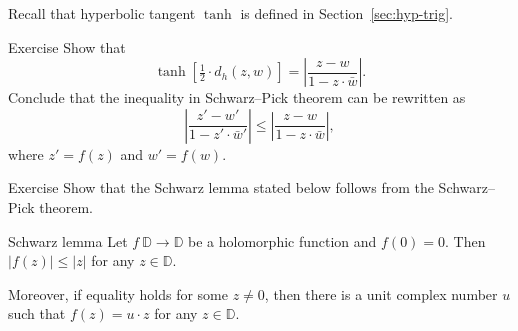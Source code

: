 Recall that hyperbolic tangent $\tanh$ is defined in Section~\ref{sec:hyp-trig}.

\begin{thm}{Exercise}\label{ex:schwarz-tanh}
Show that 
\[\tanh [\tfrac12\cdot d_h(z,w)]=\left|\frac{z-w}{1-z\cdot\bar w}\right|.\]
Conclude that the inequality in Schwarz--Pick theorem can be rewritten as
\[\left|\frac{z'-w'}{1-z'\cdot\bar w'}\right|\le\left|\frac{z-w}{1-z\cdot\bar w}\right|,\]
where
$z'=f(z)$ and $w'=f(w)$.
\end{thm}

\begin{thm}{Exercise}\label{ex:schwarz}
Show that the Schwarz lemma stated below 
follows from the Schwarz--Pick theorem.
\end{thm}

\begin{thm}{Schwarz lemma}
Let $f\: \mathbb{D}\to \mathbb{D}$ be a holomorphic function
and $f(0)=0$.
Then 
$|f(z)|\le |z|$
for any $z\in \mathbb{D}$.

Moreover, if equality holds for some $z\ne 0$, then there is a unit complex number $u$ 
such that 
$f(z)=u\cdot z$
for any $z\in\mathbb{D}$.
\end{thm}
